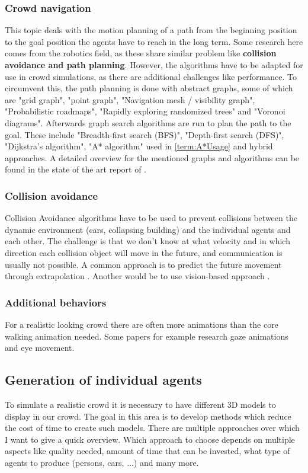 \documentclass{acmsiggraph}               %
\begin{document}
\subsubsection{Crowd navigation}
This topic deals with the motion planning of a path from the beginning position to the goal position the agents have to reach in the long term. Some research here comes from the robotics field, as these share similar problem like \textbf{collision avoidance and path planning}. However, the algorithms have to be adapted for use in crowd simulations, as there are additional challenges like performance. To circumvent this, the path planning is done with abstract graphs, some of which are "grid graph", "point graph", "Navigation mesh / visibility graph", "Probabilistic roadmaps", "Rapidly exploring randomized trees" and "Voronoi diagrams". Afterwards graph search algorithms are run to plan the path to the goal. These include "Breadth-ﬁrst search (BFS)",  "Depth-ﬁrst search (DFS)", "Dijkstra’s algorithm", "A* algorithm" used in \ref{term:A*Usage} and hybrid approaches. A detailed overview for the mentioned graphs and algorithms can be found in the state of the art report of \cite{jaros_crowd_2014}. 

\subsubsection{Collision avoidance}
Collision Avoidance algorithms have to be used to prevent collisions between the dynamic environment (cars, collapsing building) and the individual agents and each other. The challenge is that we don't know at what velocity and in which direction each collision object will move in the future, and communication is usually not possible. A common approach is to predict the future movement through extrapolation \cite{karamouzas_predictive_2009}. Another would be to use vision-based approach \cite{ondrej_synthetic-vision_2010}.

\subsubsection{Additional behaviors}
For a realistic looking crowd there are often more animations than the core walking animation needed. Some papers for example research gaze animations and eye movement. 

\subsection{Generation of individual agents}
To simulate a realistic crowd it is necessary to have different 3D models to display in our crowd. The goal in this area is to develop methods which reduce the cost of time to create such models. There are multiple approaches over which I want to give a quick overview. Which approach to choose depends on multiple aspects like quality needed, amount of time that can be invested, what type of agents to produce (persons, cars, ...) and many more. 
\end{document}
